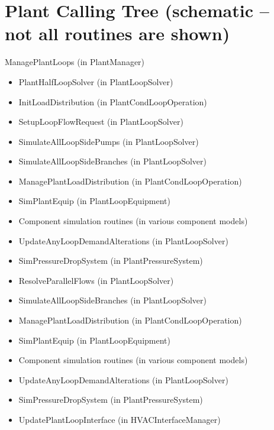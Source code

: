 \section{Plant Calling Tree (schematic -- not all routines are shown)}\label{plant-calling-tree-schematic-not-all-routines-are-shown}

ManagePlantLoops (in PlantManager)

\begin{itemize}
\item
  PlantHalfLoopSolver (in PlantLoopSolver)
\item
  InitLoadDistribution (in PlantCondLoopOperation)
\item
  SetupLoopFlowRequest (in PlantLoopSolver)
\item
  SimulateAllLoopSidePumps (in PlantLoopSolver)
\item
  SimulateAllLoopSideBranches (in PlantLoopSolver)
\item
  ManagePlantLoadDistribution (in PlantCondLoopOperation)
\item
  SimPlantEquip (in PlantLoopEquipment)
\item
  Component simulation routines (in various component models)
\item
  UpdateAnyLoopDemandAlterations (in PlantLoopSolver)
\item
  SimPressureDropSystem (in PlantPressureSystem)
\item
  ResolveParallelFlows (in PlantLoopSolver)
\item
  SimulateAllLoopSideBranches (in PlantLoopSolver)
\item
  ManagePlantLoadDistribution (in PlantCondLoopOperation)
\item
  SimPlantEquip (in PlantLoopEquipment)
\item
  Component simulation routines (in various component models)
\item
  UpdateAnyLoopDemandAlterations (in PlantLoopSolver)
\item
  SimPressureDropSystem (in PlantPressureSystem)
\item
  UpdatePlantLoopInterface (in HVACInterfaceManager)
\end{itemize}
